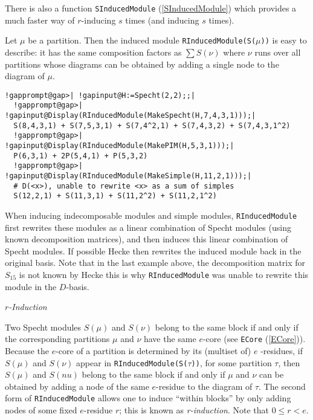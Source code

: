 \documentclass[a4paper,11pt]{report}
\begin{document}
{{{ There is also a function \texttt{SInducedModule} (\ref{SInducedModule}) which provides a much faster way of $r$-inducing $s$ times (and inducing $s$ times).

 Let $\mu$ be a partition. Then the induced module \texttt{RInducedModule(S(}$\mu$\texttt{))} is easy to describe: it has the same composition factors as $\sum S(\nu)$ where $\nu$ runs over all partitions whose diagrams can be obtained by adding a single
node to the diagram of $\mu$. 
\begin{Verbatim}[commandchars=!@|,fontsize=\small,frame=single,label=Example]
  !gapprompt@gap>| !gapinput@H:=Specht(2,2);;|
  !gapprompt@gap>| !gapinput@Display(RInducedModule(MakeSpecht(H,7,4,3,1)));|
  S(8,4,3,1) + S(7,5,3,1) + S(7,4^2,1) + S(7,4,3,2) + S(7,4,3,1^2)
  !gapprompt@gap>| !gapinput@Display(RInducedModule(MakePIM(H,5,3,1)));|
  P(6,3,1) + 2P(5,4,1) + P(5,3,2)
  !gapprompt@gap>| !gapinput@Display(RInducedModule(MakeSimple(H,11,2,1)));|
  # D(<x>), unable to rewrite <x> as a sum of simples
  S(12,2,1) + S(11,3,1) + S(11,2^2) + S(11,2,1^2)
\end{Verbatim}
 When inducing indecomposable modules and simple modules, \texttt{RInducedModule} first rewrites these modules as a linear combination of Specht modules (using
known decomposition matrices), and then induces this linear combination of
Specht modules. If possible \textsf{Hecke} then rewrites the induced module back in the original basis. Note that in the
last example above, the decomposition matrix for $S_{15}$ is not known by \textsf{Hecke} this is why \texttt{RInducedModule} was unable to rewrite this module in the $D$-basis.

 \emph{$r$-Induction}

 Two Specht modules $S(\mu)$ and $S(\nu)$ belong to the same block if and only if the corresponding partitions $\mu$ and $\nu$ have the same $e$-core \cite{JM2} (see \texttt{ECore} (\ref{ECore})). Because the $e$-core of a partition is determined by its (multiset of) $e$ -residues, if $S(\mu)$ and $S(\nu)$ appear in \texttt{RInducedModule(S(}$\tau$\texttt{))}, for some partition $\tau$, then $S(\mu)$ and $S(nu)$ belong to the same block if and only if $\mu$ and $\nu$ can be obtained by adding a node of the same $e$-residue to the diagram of $\tau$. The second form of \texttt{RInducedModule} allows one to induce ``within blocks'' by only adding nodes of some fixed $e$-residue $r$; this is known as \emph{r-induction}. Note that $0\leq r<e$.

}}}
\end{document}

